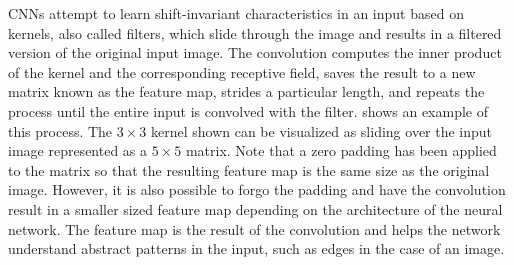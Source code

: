 CNNs attempt to learn shift-invariant characteristics in an input based on kernels, also called filters, which slide through the image and results in a filtered version of the original input image. The convolution computes the inner product of the kernel and the corresponding receptive field, saves the result to a new matrix known as the feature map, strides a particular length, and repeats the process until the entire input is convolved with the filter.  shows an example of this process. The $3 \times 3$ kernel shown can be visualized as sliding over the input image represented as a $5\times5$ matrix. Note that a zero padding has been applied to the matrix so that the resulting feature map is the same size as the original image. However, it is also possible to forgo the padding and have the convolution result in a smaller sized feature map depending on the architecture of the neural network. The feature map is the result of the convolution and helps the network understand abstract patterns in the input, such as edges in the case of an image.   

